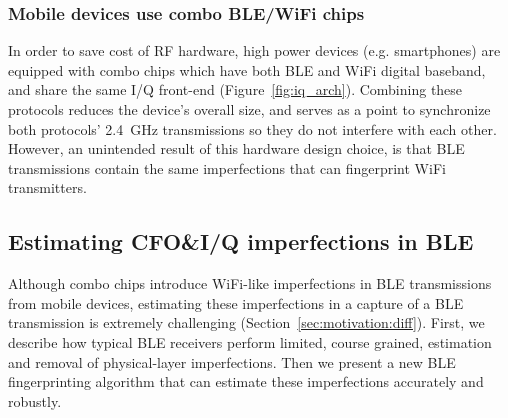 
\subsubsection*{Mobile devices use combo BLE/WiFi chips}
%
In order to save cost of RF hardware, high power devices (e.g. smartphones) are
equipped with combo chips which have both BLE and WiFi digital baseband, and
share the same I/Q front-end 
(Figure~\ref{fig:iq_arch}).
%
Combining these protocols reduces the device's overall size, and serves as a
point to synchronize both protocols' 2.4~GHz transmissions so they do not
interfere with each other.
%
However, an unintended result of this hardware design choice, is that BLE
transmissions contain the same imperfections that can fingerprint
WiFi transmitters.



\subsection{Estimating CFO\&I/Q imperfections in BLE} %
\label{sec:methodology1}
%
%
Although combo chips introduce WiFi-like imperfections in BLE transmissions
from mobile devices, estimating these imperfections in a capture of a BLE
transmission is extremely challenging (Section~\ref{sec:motivation:diff}).
%
%
%
First, we describe how typical BLE receivers perform limited, course grained,
estimation and removal of physical-layer imperfections.
%
Then we present a new BLE fingerprinting algorithm that can estimate these
imperfections accurately and robustly.

